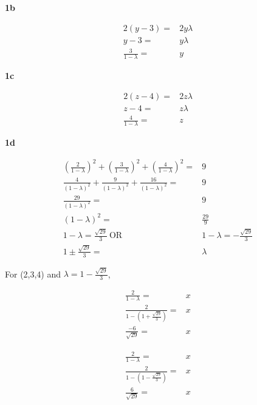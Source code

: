 \documentclass[11pt]{article}
\begin{document}
\textbf{1b}

\begin{equation}
\begin{split}
2(y - 3) = & 2 y \lambda\\
y - 3 = & y \lambda\\
\frac{3}{1 - \lambda} = & y
\end{split}
\end{equation}

\textbf{1c}

\begin{equation}
\begin{split}
2(z - 4) = & 2 z \lambda\\
z - 4 = & z \lambda\\
\frac{4}{1 - \lambda} = & z
\end{split}
\end{equation}

\textbf{1d}

\begin{equation}
\begin{split}
(\frac{2}{1 - \lambda})^2 + (\frac{3}{1 - \lambda})^2 + (\frac{4}{1 - \lambda})^2 = & 9\\
\frac{4}{(1 - \lambda)^2} + \frac{9}{(1 - \lambda)^2} + \frac{16}{(1 - \lambda)^2} = & 9\\
\frac{29}{(1 - \lambda)^2} = & 9\\
(1 - \lambda)^2 = & \frac{29}{9}\\
1 - \lambda = \frac{\sqrt{29}}{3} \ \text{OR} \ & 1 - \lambda = - \frac{\sqrt{29}}{3}\\
1 \pm \frac{\sqrt{29}}{3} = & \lambda
\end{split}
\end{equation}

For (2,3,4) and \(\lambda = 1 - \frac{\sqrt{29}}{3}\),

\begin{equation}
\begin{split}
\frac{2}{1 - \lambda} = & x\\
\frac{2}{1 - (1 + \frac{\sqrt{29}}{3})} = & x\\
\frac{-6}{\sqrt{29}} = & x
\end{split}
\end{equation}

\begin{equation}
\begin{split}
\frac{2}{1 - \lambda} = & x\\
\frac{2}{1 - (1 - \frac{\sqrt{29}}{3})} = & x\\
\frac{6}{\sqrt{29}} = & x
\end{split}
\end{equation}
\end{document}
